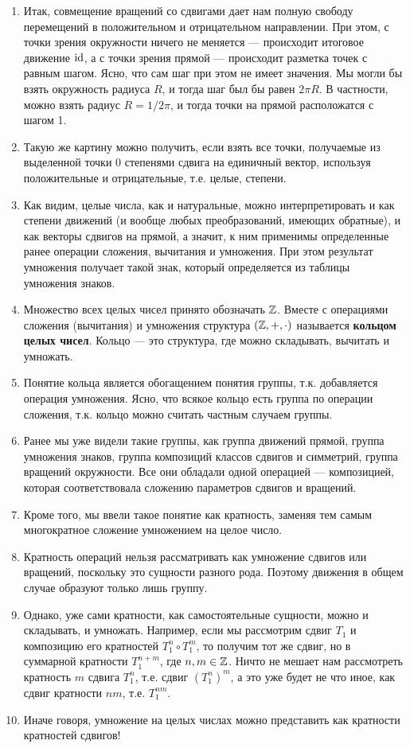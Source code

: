 \begin{enumerate}\setlength{\itemsep}{1pt}
\item Итак, совмещение вращений со сдвигами дает нам полную свободу перемещений в положительном и отрицательном направлении. При этом, с точки зрения окружности ничего не меняется --- происходит итоговое движение $\mathrm{id}$, а с точки зрения прямой --- происходит разметка точек с равным шагом. Ясно, что сам шаг при этом не имеет значения. Мы могли бы взять окружность радиуса $R$, и тогда шаг был бы равен $2\pi R$. В частности, можно взять радиус $R=1/2\pi$, и тогда точки на прямой расположатся с шагом 1.
\item Такую же картину можно получить, если взять все точки, получаемые из выделенной точки 0 степенями сдвига на единичный вектор, используя положительные и отрицательные, т.е. целые, степени.
\item Как видим, целые числа, как и натуральные, можно интерпретировать и как степени движений (и вообще любых преобразований, имеющих обратные), и как векторы сдвигов на прямой, а значит, к ним применимы определенные ранее операции сложения, вычитания и умножения. При этом результат умножения получает такой знак, который определяется из таблицы умножения знаков.
\item Множество всех целых чисел принято обозначать $\mathbb Z$. Вместе с операциями сложения (вычитания) и умножения структура $(\mathbb Z,+,\cdot)$ называется \textbf{кольцом целых чисел}. Кольцо --- это структура, где можно складывать, вычитать и умножать.
\item Понятие кольца является обогащением понятия группы, т.к. добавляется операция умножения. Ясно, что всякое кольцо есть группа по операции сложения, т.к. кольцо можно считать частным случаем группы.
\item Ранее мы уже видели такие группы, как группа движений прямой, группа умножения знаков, группа композиций классов сдвигов и симметрий, группа вращений окружности. Все они обладали одной операцией --- композицией, которая соответствовала сложению параметров сдвигов и вращений.
\item Кроме того, мы ввели такое понятие как кратность, заменяя тем самым многократное сложение умножением на целое число.
\item Кратность операций нельзя рассматривать как умножение сдвигов или вращений, поскольку это сущности разного рода. Поэтому движения в общем случае образуют только лишь группу.
\item Однако, уже сами кратности, как самостоятельные сущности, можно и складывать, и умножать. Например, если мы рассмотрим сдвиг $T_1$ и композицию его кратностей $T_1^n\circ T_1^m$, то получим тот же сдвиг, но в суммарной кратности $T_1^{n+m}$, где $n,m\in\mathbb Z$. Ничто не мешает нам рассмотреть кратность $m$ сдвига $T_1^n$, т.е. сдвиг $(T_1^n)^m$, а это уже будет не что иное, как сдвиг кратности $nm$, т.е. $T_1^{nm}$.
\item Иначе говоря, умножение на целых числах можно представить как кратности кратностей сдвигов!


\end{enumerate}
